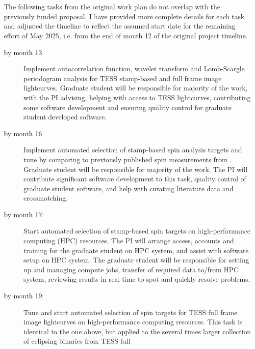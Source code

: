 \documentclass[12pt,letter]{article}
\begin{document}
\section*{}

The following tasks from the original work plan do not overlap with the
previously funded proposal. I have provided more complete details for each task
and adjusted the timeline to reflect the assumed start date for the remaining
effort of May 2025, i.e. from the end of month 12 of the original project
timeline.

\begin{description}
%
    \item[by month 13] Implement autocorrelation function, wavelet transform and
        Lomb-Scargle periodogram analysis for TESS stamp-based and full frame
        image lightcurves. Graduate student will be responsible for majority of
        the work, with the PI advising, helping with access to TESS lightcurves,
        contributing some software development and ensuring quality control for
        graduate student developed software.
%
    \item[by month 16] Implement automated selection of stamp-based spin
        analysis targets and tune by comparing to previously published spin
        measurements from \citep{CantoMartins_et_al_20, Oelkers_et_al_18,
        Lurie_et_al_17}.  Graduate student will be responsible for majority of
        the work. The PI will contribute significant software development to
        this task, quality control of graduate student software, and help with
        curating literature data and crossmatching.
%
    \item[by month 17:] Start automated selection of stamp-based spin targets on
        high-performance computing (HPC) resources. The PI will arrange access,
        accounts and training for the graduate student on HPC system, and assist
        with software setup on HPC system. The graduate student will be
        responsible for setting up and managing compute jobs, transfer of
        required data to/from HPC system, reviewing results in real time to spot
        and quickly resolve problems.
%
    \item[by month 19:] Tune and start automated selection of spin targets for
        TESS full frame image lightcurves on high-performance computing
        resources. This task is identical to the one above, but applied to the
        several times larger collection of eclipsing binaries from TESS full

\end{description}
\end{document}
